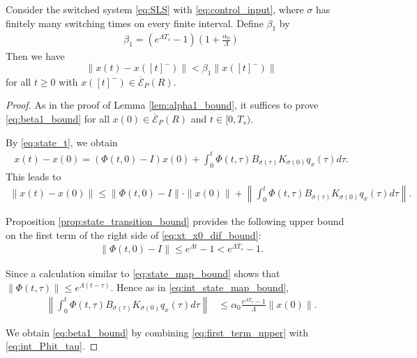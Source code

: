 \documentclass[a4, 11pt]{article}
\begin{document}
\begin{lemma}
\label{lem:beta1_bound}
Consider the switched system \eqref{eq:SLS} with \eqref{eq:control_input}, 
where $\sigma$ has finitely many switching times
on every finite interval.
Define $\beta_1$ by
\begin{align*}
\beta_1 = (e^{\Lambda T_s} - 1) \left( 1 +  \frac{\alpha_0}{\Lambda} \right)
\end{align*}
Then we have
\begin{equation}
\label{eq:beta1_bound}
\|x(t) - x([t]^-) \| < \beta_1 \|x([t]^-)\|
\end{equation}
for all $t \geq 0$ with 
$x([t]^-) \in
\overline{\mathcal{E}}_P(R)$.
\end{lemma}
\begin{proof}
As in the proof of Lemma \ref{lem:alpha1_bound}, it suffices to prove
\eqref{eq:beta1_bound} for all 
$x(0) \in \overline{\mathcal{E}}_P(R)$ and 
$t \in [0,T_s)$.

By \eqref{eq:state_t}, we obtain
\begin{align*}
x(t) - x(0) = 
(\Phi(t,0) - I) x(0)  + \int^{t}_0 \Phi(t,\tau)
B_{\sigma(\tau)} K_{\sigma(0)} q_x(\tau) d \tau.
\end{align*}
This leads to
\begin{align}
\|x(t) - x(0)\| \leq
\| \Phi(t,0) - I \| \cdot \|x(0) \| + \left\| \int^{t}_0 \Phi(t,\tau)
B_{\sigma(\tau)} K_{\sigma(0)} q_x(\tau) d \tau \right\|.
\label{eq:xt_x0_dif_bound}
\end{align}

Proposition \ref{prop:state_transition_bound} provides
the following upper bound on the first term of the right side of 
\eqref{eq:xt_x0_dif_bound}:
\begin{align}
\label{eq:first_term_upper}
\|\Phi(t,0) - I\| \leq
e^{\Lambda t} - 1 < e^{\Lambda T_s} - 1.
\end{align}

Since a
calculation similar to \eqref{eq:state_map_bound} shows that
$\| \Phi (t,\tau) \| \leq e^{\Lambda(t-\tau)}$. 
Hence as in \eqref{eq:int_state_map_bound},
\begin{align}
\left\| 
\int^{t}_0 \Phi(t,\tau)
B_{\sigma(\tau)} K_{\sigma(0)} q_x(\tau) d \tau \right\|
&\leq
\alpha_0 \frac{e^{\Lambda T_s} - 1}{\Lambda} \|x(0)\|.
\label{eq:int_Phit_tau}
\end{align}


We obtain \eqref{eq:beta1_bound} by
combining \eqref{eq:first_term_upper}
with \eqref{eq:int_Phit_tau}.
\end{proof}
\end{document}
